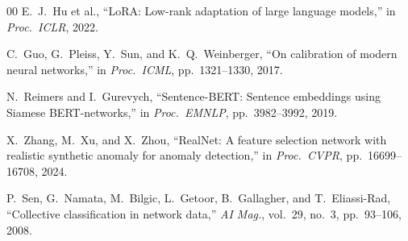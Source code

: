 \documentclass[conference]{IEEEtran}
\begin{document}
\begin{thebibliography}{00}
 E.~J.~Hu et al., ``LoRA: Low-rank adaptation of large language models,'' in \textit{Proc.\ ICLR}, 2022.

 C.~Guo, G.~Pleiss, Y.~Sun, and K.~Q.~Weinberger, ``On calibration of modern neural networks,'' in \textit{Proc.\ ICML}, pp.~1321--1330, 2017.

 N.~Reimers and I.~Gurevych, ``Sentence-BERT: Sentence embeddings using Siamese BERT-networks,'' in \textit{Proc.\ EMNLP}, pp.~3982--3992, 2019.

 X.~Zhang, M.~Xu, and X.~Zhou, ``RealNet: A feature selection network with realistic synthetic anomaly for anomaly detection,'' in \textit{Proc.\ CVPR}, pp.~16699--16708, 2024.

 P.~Sen, G.~Namata, M.~Bilgic, L.~Getoor, B.~Gallagher, and T.~Eliassi-Rad, ``Collective classification in network data,'' \textit{AI Mag.}, vol.~29, no.~3, pp.~93--106, 2008.

\end{thebibliography}
\end{document}
